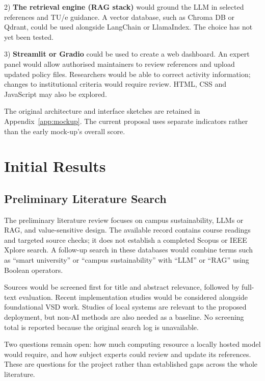 \documentclass[11pt,a4paper]{article}
\begin{document}
2) \textbf{The retrieval engine (RAG stack)} would ground the LLM in selected references and TU/e guidance. A vector database, such as Chroma DB or Qdrant, could be used alongside LangChain or LlamaIndex. The choice has not yet been tested.

3) \textbf{Streamlit or Gradio} could be used to create a web dashboard. An expert panel would allow authorised maintainers to review references and upload updated policy files. Researchers would be able to correct activity information; changes to institutional criteria would require review. HTML, CSS and JavaScript may also be explored.

The original architecture and interface sketches are retained in Appendix~\ref{app:mockup}. The current proposal uses separate indicators rather than the early mock-up's overall score.

\clearpage
\section{Initial Results}

\subsection{Preliminary Literature Search}

The preliminary literature review focuses on campus sustainability, LLMs or RAG, and value-sensitive design. The available record contains course readings and targeted source checks; it does not establish a completed Scopus or IEEE Xplore search. A follow-up search in these databases would combine terms such as ``smart university'' or ``campus sustainability'' with ``LLM'' or ``RAG'' using Boolean operators.

Sources would be screened first for title and abstract relevance, followed by full-text evaluation. Recent implementation studies would be considered alongside foundational VSD work. Studies of local systems are relevant to the proposed deployment, but non-AI methods are also needed as a baseline. No screening total is reported because the original search log is unavailable.

Two questions remain open: how much computing resource a locally hosted model would require, and how subject experts could review and update its references. These are questions for the project rather than established gaps across the whole literature.
\end{document}
